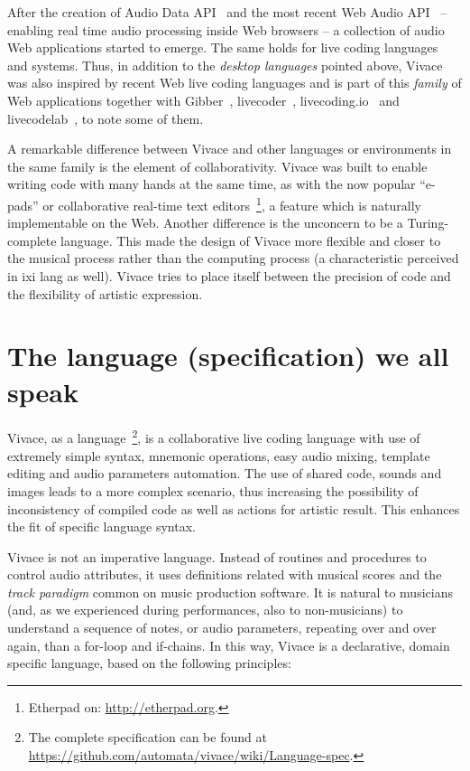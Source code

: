 \documentclass[letterpaper, 12pt]{article}
\begin{document}
{After the creation of Audio Data API~\citep{audiodata} and the most
recent Web Audio API~\citep{webaudio} -- enabling real time audio
processing inside Web browsers -- a collection of audio Web
applications started to emerge. The same holds for live coding
languages and systems.  Thus, in addition to the \textit{desktop
  languages} pointed above, Vivace was also inspired by recent Web
live coding languages and is part of this \textit{family} of Web
applications together with Gibber~\citep{gibber},
livecoder~\citep{livecoder}, livecoding.io~\citep{livecodingio} and
livecodelab~\citep{livecodelab}, to note some of them.

A remarkable difference between Vivace and other languages or
environments in the same family is the element of
collaborativity. Vivace was built to enable writing code with many
hands at the same time, as with the now popular ``e-pads'' or
collaborative real-time text editors~\footnote{Etherpad on:
  \url{http://etherpad.org}.}, a feature which is naturally
implementable on the Web. Another difference is the unconcern to be a
Turing-complete language. This made the design of Vivace more flexible
and closer to the musical process rather than the computing process (a
characteristic perceived in ixi lang as well). Vivace tries to place
itself between the precision of code and the flexibility of artistic
expression.

\section{The language (specification) we all speak}

Vivace, as a language~\footnote{The complete specification can be
  found at
  \url{https://github.com/automata/vivace/wiki/Language-spec}.}, is a
collaborative live coding language with use of extremely simple
syntax, mnemonic operations, easy audio mixing, template editing and
audio parameters automation. The use of shared code, sounds and images
leads to a more complex scenario, thus increasing the possibility of
inconsistency of compiled code as well as actions for artistic
result. This enhances the fit of specific language syntax.

Vivace is not an imperative language. Instead of routines and
procedures to control audio attributes, it uses definitions related
with musical scores and the \emph{track paradigm} common on music
production software. It is natural to musicians (and, as we
experienced during performances, also to non-musicians) to understand
a sequence of notes, or audio parameters, repeating over and over
again, than a for-loop and if-chains. In this way, Vivace is a
declarative, domain specific language, based on the following
principles:

}
\end{document}
